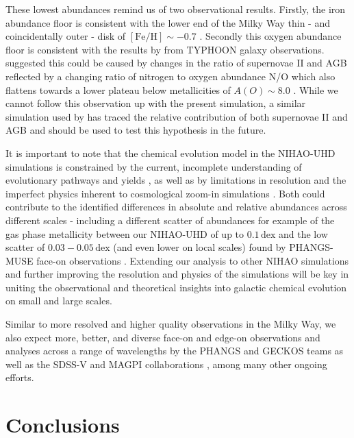 \documentclass[twocolumn,apj,numberedappendix,appendixfloats,twocolappendix]{openjournal}
\begin{document}
\begin{CJK*}{UTF8}{gbsn}
These lowest abundances remind us of two observational results. Firstly, the iron abundance floor is consistent with the lower end of the Milky Way thin - and coincidentally outer - disk of $\mathrm{[Fe/H]} \sim -0.7$ \citep{Bensby2014, Buder2019}. Secondly this oxygen abundance floor is consistent with the results by \citet{Grasha2022} from TYPHOON galaxy observations. \citet{Grasha2022} suggested this could be caused by changes in the ratio of supernovae II and AGB reflected by a changing ratio of nitrogen to oxygen abundance N/O which also flattens towards a lower plateau below metallicities of $A(O) \sim 8.0$ \citep{Nicholls2017}. While we cannot follow this observation up with the present simulation, a similar simulation used by \citet{Buder2024} has traced the relative contribution of both supernovae II and AGB and should be used to test this hypothesis in the future.

It is important to note that the chemical evolution model in the NIHAO-UHD simulations is constrained by the current, incomplete understanding of evolutionary pathways and yields \citep{Buck2021}, as well as by limitations in resolution and the imperfect physics inherent to cosmological zoom-in simulations \citep{Buck2020}.
Both could contribute to the identified differences in absolute and relative abundances across different scales - including a different scatter of abundances for example of the gas phase metallicity between our NIHAO-UHD of up to $0.1\,\mathrm{dex}$ and the low scatter of $0.03-0.05\,\mathrm{dex}$ (and even lower on local scales) found by PHANGS-MUSE face-on observations \citep{Kreckel2020}. Extending our analysis to other NIHAO simulations and further improving the resolution and physics of the simulations will be key in uniting the observational and theoretical insights into galactic chemical evolution on small and large scales.

Similar to more resolved and higher quality observations in the Milky Way, we also expect more, better, and diverse face-on and edge-on observations and analyses across a range of wavelengths by the PHANGS and GECKOS teams \citep{Kreckel2019, Kreckel2020, GECKOS2023} as well as the SDSS-V and MAGPI collaborations \citep{Kollmeier2017, MAGPI2021, Mun2024, Chen2024}, among many other ongoing efforts.

\section{Conclusions}
\label{sec:conc}


\end{CJK*}
\end{document}
